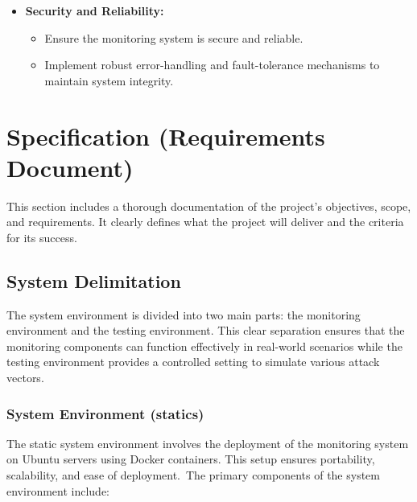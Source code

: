 \documentclass{article}
\begin{document}
\begin{itemize}
        \item \textbf{Security and Reliability:}
        \begin{itemize}
            \item Ensure the monitoring system is secure and reliable.
            \item Implement robust error-handling and fault-tolerance mechanisms to maintain system integrity.
        \end{itemize}


    \end{itemize}



    \newpage
    \section{Specification (Requirements Document)}\label{sec:specification}

    This section includes a thorough documentation of the project's objectives, scope, and requirements.
    It clearly defines what the project will deliver and the criteria for its success.

    \subsection{System Delimitation}\label{subsec:system-delimitation}

    The system environment is divided into two main parts: the monitoring environment and the testing environment.
    This clear separation ensures that the monitoring components can function effectively in real-world scenarios while the testing environment provides a controlled setting to simulate various attack vectors.

    \subsubsection{System Environment (statics)}\label{subsubsec:system-environment}

    The static system environment involves the deployment of the monitoring system on Ubuntu servers using Docker containers.
    This setup ensures portability, scalability, and ease of deployment.\ The primary components of the system environment include:
\end{document}
